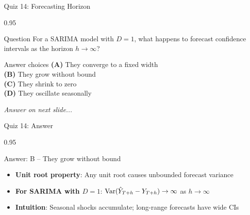 \documentclass[9pt, aspectratio=169, t]{beamer}
\begin{document}
\begin{frame}{Quiz 14: Forecasting Horizon}
    \begin{cminipage}{0.95\textwidth}
    \begin{alertblock}{Question}
        For a SARIMA model with $D=1$, what happens to forecast confidence intervals as the horizon $h \to \infty$?
    \end{alertblock}

    \vspace{0.4cm}

    \begin{block}{Answer choices}
        \textcolor{MainBlue}{\textbf{(A)}} They converge to a fixed width\\[3pt]
        \textcolor{MainBlue}{\textbf{(B)}} They grow without bound\\[3pt]
        \textcolor{MainBlue}{\textbf{(C)}} They shrink to zero\\[3pt]
        \textcolor{MainBlue}{\textbf{(D)}} They oscillate seasonally
    \end{block}

    \vspace{0.5cm}

    \begin{center}
        \textit{Answer on next slide...}
    \end{center}
    \end{cminipage}
\end{frame}

\begin{frame}{Quiz 14: Answer}
    \begin{cminipage}{0.95\textwidth}
    \begin{exampleblock}{Answer: B -- They grow without bound}
        \begin{itemize}
            \item \textbf{Unit root property}: Any unit root causes unbounded forecast variance
            \item \textbf{For SARIMA with $D=1$}: $\text{Var}(\hat{Y}_{T+h} - Y_{T+h}) \to \infty$ as $h \to \infty$
            \item \textbf{Intuition}: Seasonal shocks accumulate; long-range forecasts have wide CIs
        \end{itemize}
    \end{exampleblock}

    \end{cminipage}
\end{frame}
\end{document}
